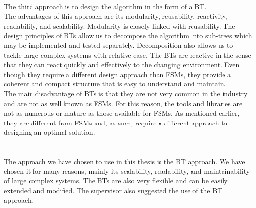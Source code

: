     \\
        The third approach is to design the algorithm in the form of a BT.\\
        The advantages of this approach are its modularity, reusability, reactivity, readability, and scalability. Modularity is closely linked with reusability. The design principles of BTs allow us to decompose the algorithm into sub-trees which may be implemented and tested separately. Decomposition also allows us to tackle large complex systems with relative ease. The BTs are reactive in the sense that they can react quickly and effectively to the changing environment. Even though they require a different design approach than FSMs, they provide a coherent and compact structure that is easy to understand and maintain.\\
        The main disadvantage of BTs is that they are not very common in the industry and are not as well known as FSMs. For this reason, the tools and libraries are not as numerous or mature as those available for FSMs. As mentioned earlier, they are different from FSMs and, as such, require a different approach to designing an optimal solution.\\\\
    \\
        The approach we have chosen to use in this thesis is the BT approach. We have chosen it for many reasons, mainly its scalability, readability, and maintainability of large complex systems. The BTs are also very flexible and can be easily extended and modified. The supervisor also suggested the use of the BT approach.